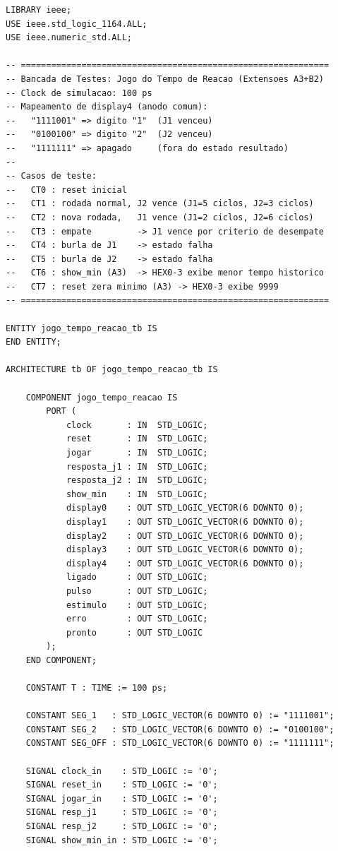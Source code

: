 \documentclass[12pt,a4paper]{article}
\begin{document}
\begin{lstlisting}[caption={Bancada de testes -- \texttt{jogo\_tempo\_reacao\_tb.vhd}},
                   label={lst:tb}]
LIBRARY ieee;
USE ieee.std_logic_1164.ALL;
USE ieee.numeric_std.ALL;

-- =============================================================
-- Bancada de Testes: Jogo do Tempo de Reacao (Extensoes A3+B2)
-- Clock de simulacao: 100 ps
-- Mapeamento de display4 (anodo comum):
--   "1111001" => digito "1"  (J1 venceu)
--   "0100100" => digito "2"  (J2 venceu)
--   "1111111" => apagado     (fora do estado resultado)
--
-- Casos de teste:
--   CT0 : reset inicial
--   CT1 : rodada normal, J2 vence (J1=5 ciclos, J2=3 ciclos)
--   CT2 : nova rodada,   J1 vence (J1=2 ciclos, J2=6 ciclos)
--   CT3 : empate         -> J1 vence por criterio de desempate
--   CT4 : burla de J1    -> estado falha
--   CT5 : burla de J2    -> estado falha
--   CT6 : show_min (A3)  -> HEX0-3 exibe menor tempo historico
--   CT7 : reset zera minimo (A3) -> HEX0-3 exibe 9999
-- =============================================================

ENTITY jogo_tempo_reacao_tb IS
END ENTITY;

ARCHITECTURE tb OF jogo_tempo_reacao_tb IS

    COMPONENT jogo_tempo_reacao IS
        PORT (
            clock       : IN  STD_LOGIC;
            reset       : IN  STD_LOGIC;
            jogar       : IN  STD_LOGIC;
            resposta_j1 : IN  STD_LOGIC;
            resposta_j2 : IN  STD_LOGIC;
            show_min    : IN  STD_LOGIC;
            display0    : OUT STD_LOGIC_VECTOR(6 DOWNTO 0);
            display1    : OUT STD_LOGIC_VECTOR(6 DOWNTO 0);
            display2    : OUT STD_LOGIC_VECTOR(6 DOWNTO 0);
            display3    : OUT STD_LOGIC_VECTOR(6 DOWNTO 0);
            display4    : OUT STD_LOGIC_VECTOR(6 DOWNTO 0);
            ligado      : OUT STD_LOGIC;
            pulso       : OUT STD_LOGIC;
            estimulo    : OUT STD_LOGIC;
            erro        : OUT STD_LOGIC;
            pronto      : OUT STD_LOGIC
        );
    END COMPONENT;

    CONSTANT T : TIME := 100 ps;

    CONSTANT SEG_1   : STD_LOGIC_VECTOR(6 DOWNTO 0) := "1111001";
    CONSTANT SEG_2   : STD_LOGIC_VECTOR(6 DOWNTO 0) := "0100100";
    CONSTANT SEG_OFF : STD_LOGIC_VECTOR(6 DOWNTO 0) := "1111111";

    SIGNAL clock_in    : STD_LOGIC := '0';
    SIGNAL reset_in    : STD_LOGIC := '0';
    SIGNAL jogar_in    : STD_LOGIC := '0';
    SIGNAL resp_j1     : STD_LOGIC := '0';
    SIGNAL resp_j2     : STD_LOGIC := '0';
    SIGNAL show_min_in : STD_LOGIC := '0';


\end{lstlisting}
\end{document}
